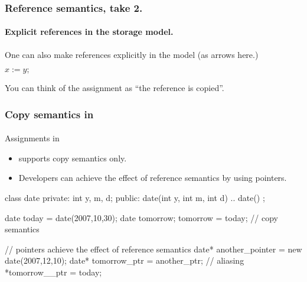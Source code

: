\documentclass{beamer}
\begin{document}
\begin{frame}
\frametitle{Reference semantics, take 2.}
\framesubtitle{Explicit references in the storage model.}

One can also make references explicitly in the model (as arrows here.)

{\small 
{}
}
$x := y;$
{\small 
{}
}

You can think of the assignment as ``the reference is copied''.

\end{frame}




\begin{frame}[fragile]
\frametitle{Copy semantics in \Cpp}
\framesubtitle{}
Assignments in \Cpp 
\begin{itemize}
\item \Cpp supports copy semantics only. 
\item Developers can achieve the
effect of reference semantics by using pointers. 
\end{itemize}

\begin{cplus}
class date {
private:
    int y, m, d;
public:
    date(int y, int m, int d) {..}
    date() {}
};

date today = date(2007,10,30);
date tomorrow; 
tomorrow = today;  // copy semantics

// pointers achieve the effect of reference semantics
date* another_pointer = new date(2007,12,10);
date* tomorrow_ptr    = another_ptr;   // aliasing
*tomorrow__ptr = today;
\end{cplus}


\end{frame}
\end{document}
